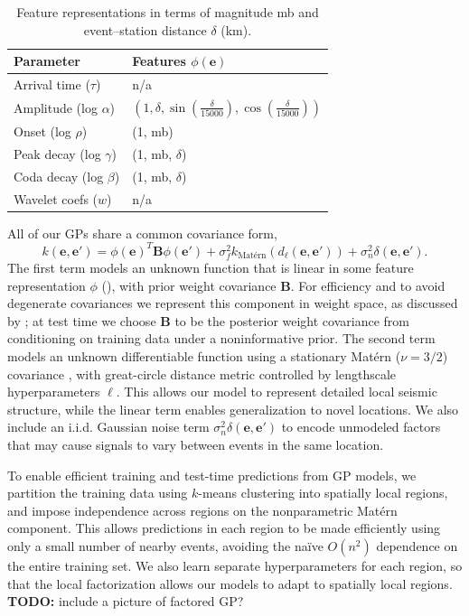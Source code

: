 \documentclass[twoside]{article} \usepackage{aistats2017}
\renewcommand{\v}[1]{\mathbf{#1}}
\newcommand{\todo}[1]{{\color{red} \textbf{TODO:} {#1}}}
\begin{document}
\begin{table}
\centering
\begin{tabular}{ll}
\hline
\textbf{Parameter} & \textbf{Features $\phi(\v{e})$} \\\hline
Arrival time ($\tau$) & n/a  \\
Amplitude (log $\alpha$) & $\left(1,\delta,\sin(\frac{\delta}{15000}),
                           \cos(\frac{\delta}{15000})\right)$ \\
Onset (log $\rho$) & (1, mb) \\
Peak decay (log $\gamma$) & (1, mb, $\delta$) \\
Coda decay (log $\beta$) & (1, mb, $\delta$) \\
Wavelet coefs ($w$) & n/a \\\hline
\end{tabular}
\caption{Feature representations in terms
  of magnitude mb and event--station distance $\delta$ (km).}
\label{tbl:gp_models}
\end{table}

All of our GPs share a common covariance form,
\[k(\v{e}, \v{e}') = \phi(\v{e})^T \v{B}\phi(\v{e}') + \sigma^2_f
k_\text{Mat\'ern}(d_\ell(\v{e}, \v{e}')) + \sigma^2_n \delta(\v{e},
\v{e}').\]
The first term models an unknown function that is linear in some
feature representation $\phi$ (), with prior
weight covariance $\v{B}$. For efficiency and to avoid degenerate
covariances we represent this component in weight space, as discussed
by \citet[section 2.7]{rasmussen2006}; at test time we choose $\v{B}$
to be the posterior weight covariance from conditioning on training
data under a noninformative prior. The second term models an unknown
differentiable function using a stationary Mat\'ern ($\nu=3/2$) covariance \citep[Chapter
4]{rasmussen2006}, with great-circle distance metric controlled by
lengthscale hyperparameters $\ell$. This allows our model to represent
detailed local seismic structure, while the linear term enables
generalization to novel locations. We also include an i.i.d. Gaussian noise
term $\sigma^2_n \delta(\v{e}, \v{e}')$ to encode unmodeled factors that may cause signals to vary
between events in the same location.

To enable efficient training and test-time predictions from GP models,
we partition the training data using $k$-means clustering into spatially local regions, and impose
independence across regions on the nonparametric Mat\'ern
component. This allows predictions in each region to be made efficiently
using only a small number of nearby events, avoiding the na\"ive
$O(n^2)$ dependence on the entire training set. We also learn separate
hyperparameters for each region, so that the local factorization allows
our models to adapt to spatially local regions.
\todo{include a picture of factored GP?}
\end{document}
